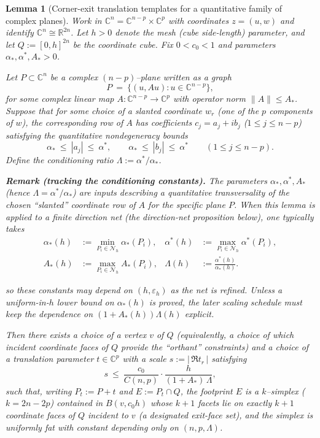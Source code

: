 \documentclass[11pt]{article}
\numberwithin{equation}{section}  %
\theoremstyle{plain}
\newtheorem{lemma}[theorem]{Lemma}
\theoremstyle{definition}
\theoremstyle{remark}
\newcommand{\R}{\mathbb{R}}
\newcommand{\C}{\mathbb{C}}
\begin{document}
\begin{lemma}[Corner-exit translation templates for a quantitative family of complex planes]\label{lem:corner-exit-template-open}
Work in $\C^n=\C^{n-p}\times\C^p$ with coordinates $z=(u,w)$ and identify $\C^n\cong\R^{2n}$.
Let $h>0$ denote the mesh (cube side-length) parameter, and let $Q:=[0,h]^{2n}$ be the coordinate cube.
Fix $0<c_0<1$ and parameters $\alpha_*,\alpha^*,A_*>0$.

\smallskip\noindent
Let $P\subset\C^n$ be a complex $(n-p)$--plane written as a graph
\[
P\ =\ \{(u,Au):u\in\C^{n-p}\},
\]
for some complex linear map $A:\C^{n-p}\to\C^p$ with operator norm $\|A\|\le A_*$.
Suppose that for some choice of a \emph{slanted} coordinate $w_r$ (one of the $p$ components of $w$), the corresponding row of $A$ has coefficients
$c_j=a_j+i b_j$ ($1\le j\le n-p$) satisfying the quantitative nondegeneracy bounds
\[
\alpha_*\ \le\ |a_j|\ \le\ \alpha^*,\qquad \alpha_*\ \le\ |b_j|\ \le\ \alpha^*\qquad (1\le j\le n-p).
\]
Define the conditioning ratio $\Lambda:=\alpha^*/\alpha_*$.


\smallskip\noindent\textbf{Remark (tracking the conditioning constants).}
The parameters $\alpha_*,\alpha^*,A_*$ (hence $\Lambda=\alpha^*/\alpha_*$) are \emph{inputs} describing a quantitative transversality of the chosen
``slanted'' coordinate row of $A$ for the specific plane $P$.
When this lemma is applied to a \emph{finite direction net} (the direction-net proposition below), one typically takes
\[
\begin{aligned}
	\alpha_*(h) &:= \min_{P_i\in\mathcal N_h}\alpha_*(P_i), &
	\alpha^*(h) &:= \max_{P_i\in\mathcal N_h}\alpha^*(P_i), \\
	A_*(h) &:= \max_{P_i\in\mathcal N_h}A_*(P_i), &
	\Lambda(h) &:= \frac{\alpha^*(h)}{\alpha_*(h)} .
\end{aligned}
\]

so these constants may depend on $(h,\varepsilon_h)$ as the net is refined.
Unless a uniform-in-$h$ lower bound on $\alpha_*(h)$ is proved, the later scaling schedule must keep the dependence on $(1+A_*(h))\Lambda(h)$ explicit.


\smallskip\noindent
Then there exists a choice of a \emph{vertex} $v$ of $Q$ (equivalently, a choice of which incident coordinate faces of $Q$ provide the ``orthant'' constraints)
and a choice of a translation parameter $t\in\C^p$ with a scale $s:=|\,\Re t_r\,|$ satisfying
\[
s\ \le\ \frac{c_0}{C(n,p)}\cdot \frac{h}{(1+A_*)\,\Lambda},
\]
such that, writing $P_t:=P+t$ and $E:=P_t\cap Q$, the footprint $E$ is a $k$--simplex ($k=2n-2p$) contained in $B(v,c_0h)$ whose $k\!+\!1$ facets lie on
exactly $k\!+\!1$ coordinate faces of $Q$ incident to $v$ (a designated exit-face set), and the simplex is uniformly fat with constant depending only on
$(n,p,\Lambda)$.


\end{lemma}
\end{document}
